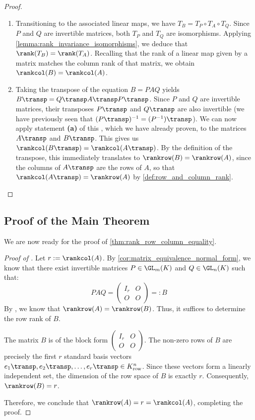 \begin{proof}
\begin{enumerate}[label=\textbf{(\alph*)}]
    \item Transitioning to the associated linear maps, we have $T_B = T_P \circ T_A \circ T_Q$. Since $P$ and $Q$ are invertible matrices, both $T_P$ and $T_Q$ are isomorphisms. Applying \cref{lemma:rank_invariance_isomorphisms}, we deduce that $\rank(T_B) = \rank(T_A)$. Recalling that the rank of a linear map given by a matrix matches the column rank of that matrix, we obtain $\rankcol(B) = \rankcol(A)$.

    \item Taking the transpose of the equation $B = PAQ$ yields $B\transp = Q\transp A\transp P\transp$. Since $P$ and $Q$ are invertible matrices, their transposes $P\transp$ and $Q\transp$ are also invertible (we have previously seen that $(P\transp)^{-1} = (P^{-1})\transp$). We can now apply statement \textbf{(a)} of this , which we have already proven, to the matrices $A\transp$ and $B\transp$. This gives us $\rankcol(B\transp) = \rankcol(A\transp)$. By the definition of the transpose, this immediately translates to $\rankrow(B) = \rankrow(A)$, since the columns of $A\transp$ are the rows of $A$, so that $\rankcol(A\transp) = \rankrow(A)$ by \cref{def:row_and_column_rank}.
\end{enumerate}
\end{proof}

\subsection{Proof of the Main Theorem}

We are now ready for the proof of \cref{thm:rank_row_column_equality}.

\begin{proof}[Proof of ]
Let $r := \rankcol(A)$. By \cref{cor:matrix_equivalence_normal_form}, we know that there exist invertible matrices $P \in \GL_m(K)$ and $Q \in \GL_n(K)$ such that:
\begin{equation*}
    P A Q = \begin{pmatrix} I_r & O \\ O & O \end{pmatrix} =: B
\end{equation*}
By , we know that $\rankrow(A) = \rankrow(B)$. Thus, it suffices to determine the row rank of $B$.

The matrix $B$ is of the block form $\left(\begin{smallmatrix} I_r & O \\ O & O \end{smallmatrix}\right)$. The non-zero rows of $B$ are precisely the first $r$ standard basis vectors $e_1\transp, e_2\transp, \dots, e_r\transp \in K_{\text{row}}^n$. Since these vectors form a linearly independent set, the dimension of the row space of $B$ is exactly $r$. Consequently, $\rankrow(B) = r$.

Therefore, we conclude that $\rankrow(A) = r = \rankcol(A)$, completing the proof.
\end{proof}

